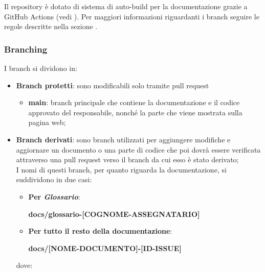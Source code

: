 Il repository è dotato di sistema di auto-build per la documentazione grazie a GitHub Actions (vedi ).
Per maggiori informazioni riguardanti i branch seguire le regole descritte nella sezione .

\subsubsection{Branching}\label{inf:branch}
I branch si dividono in:
\begin{itemize}
      \item \textbf{Branch protetti}: sono modificabili solo tramite pull request
            \begin{itemize}
                  \item \textbf{main}: branch principale che contiene la documentazione e il codice approvato del responsabile,
                        nonché la parte che viene mostrata sulla pagina web;
            \end{itemize}
      \item \textbf{Branch derivati}: sono branch utilizzati per aggiungere modifiche e aggiornare un documento o una parte di codice che poi dovrà essere verificata
            attraverso una pull request verso il branch da cui esso è stato derivato;\\
            I nomi di questi branch, per quanto riguarda la documentazione, si suddividono in due casi:
            \begin{itemize}
                  \item \textbf{Per \textit{Glossario}}:
                        \begin{center}
                              \textbf{docs/glossario-[COGNOME-ASSEGNATARIO]}
                        \end{center}
                  \item \textbf{Per tutto il resto della documentazione}:
                        \begin{center}
                              \textbf{docs/[NOME-DOCUMENTO]-[ID-ISSUE]}
                        \end{center}
            \end{itemize}
            dove:


\end{itemize}
